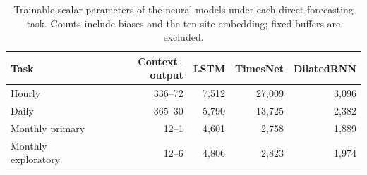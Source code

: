 \begin{table}[!t]
\centering
\caption{Trainable scalar parameters of the neural models under each direct
forecasting task. Counts include biases and the ten-site embedding; fixed
buffers are excluded.}
\label{tab:model_capacity}
\footnotesize
\setlength{\tabcolsep}{5pt}
\renewcommand{\arraystretch}{1.10}
\begin{tabular}{@{}lrrrr@{}}
\toprule
\textbf{Task} & \textbf{Context--output} & \textbf{LSTM} &
\textbf{TimesNet} & \textbf{DilatedRNN} \\
\midrule
Hourly & 336--72 & 7,512 & 27,009 & 3,096 \\
Daily & 365--30 & 5,790 & 13,725 & 2,382 \\
Monthly primary & 12--1 & 4,601 & 2,758 & 1,889 \\
Monthly exploratory & 12--6 & 4,806 & 2,823 & 1,974 \\
\bottomrule
\end{tabular}
\end{table}

